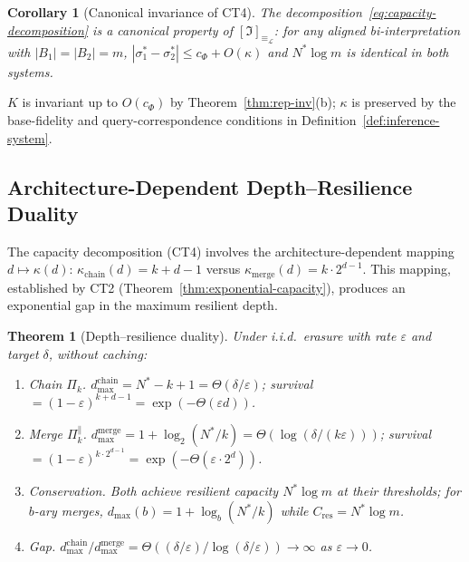 \documentclass[journal]{IEEEtran}
\makeatletter
\newtheorem{theorem}{Theorem}[section]
\newtheorem{corollary}{Corollary}[section]
\numberwithin{equation}{section}
\renewenvironment{proof}[1][\proofname]{\par
  \pushQED{\qed}%
  \normalfont \topsep6\p@\@plus6\p@\relax
  \trivlist
  \item[\hskip\labelsep
        \itshape
    #1\@addpunct{.}]\ignorespaces
}{%
  \popQED\endtrivlist\@endpefalse
}
\makeatother
\begin{document}
\begin{corollary}[Canonical invariance of CT4]
\label{cor:ct4-canonical}
The decomposition~\eqref{eq:capacity-decomposition} is a
canonical property of
$[\mathfrak{I}]_{\equiv_{\mathcal{L}}}$:
for any aligned bi-interpretation with $|B_1|=|B_2|=m$,
$|\sigma^*_1-\sigma^*_2|\le c_\Phi+O(\kappa)$
and $N^*\log m$ is identical in both systems.
\end{corollary}

\begin{proof}
$K$ is invariant up to $O(c_\Phi)$ by
Theorem~\ref{thm:rep-inv}(b);
$\kappa$ is preserved by the base-fidelity and
query-correspondence conditions in
Definition~\ref{def:inference-system}.
\end{proof}

\subsection{Architecture-Dependent Depth--Resilience Duality}
\label{subsec:depth-resilience-duality}

The capacity decomposition (CT4) involves the architecture-dependent
mapping $d\mapsto\kappa(d)$:
$\kappa_{\mathrm{chain}}(d)=k{+}d{-}1$ versus
$\kappa_{\mathrm{merge}}(d)=k\cdot 2^{d-1}$.
This mapping, established by CT2
(Theorem~\ref{thm:exponential-capacity}), produces an exponential
gap in the maximum resilient depth.

\begin{theorem}[Depth--resilience duality]
\label{thm:depth-resilience-duality}
Under i.i.d.\ erasure with rate $\varepsilon$ and target
$\delta$, without caching:

\begin{enumerate}[label=\textup{(\Roman*)}]
\item \emph{Chain $\Pi_k$.}
$d_{\max}^{\mathrm{chain}}=N^*-k+1=\Theta(\delta/\varepsilon)$;
survival $=(1{-}\varepsilon)^{k+d-1}
 =\exp(-\Theta(\varepsilon d))$.

\item \emph{Merge $\Pi_k^{\parallel}$.}
$d_{\max}^{\mathrm{merge}}
 =1+\log_2(N^*/k)
 =\Theta(\log(\delta/(k\varepsilon)))$;
survival $=(1{-}\varepsilon)^{k\cdot 2^{d-1}}
 =\exp(-\Theta(\varepsilon\cdot 2^d))$.

\item \emph{Conservation.}
Both achieve resilient capacity $N^*\log m$ at their
thresholds; for $b$-ary merges,
$d_{\max}(b)=1+\log_b(N^*/k)$ while
$C_{\mathrm{res}}=N^*\log m$.

\item \emph{Gap.}
$d_{\max}^{\mathrm{chain}}/d_{\max}^{\mathrm{merge}}
 =\Theta((\delta/\varepsilon)/\log(\delta/\varepsilon))
 \to\infty$ as $\varepsilon\to 0$.
\end{enumerate}
\end{theorem}
\end{document}
